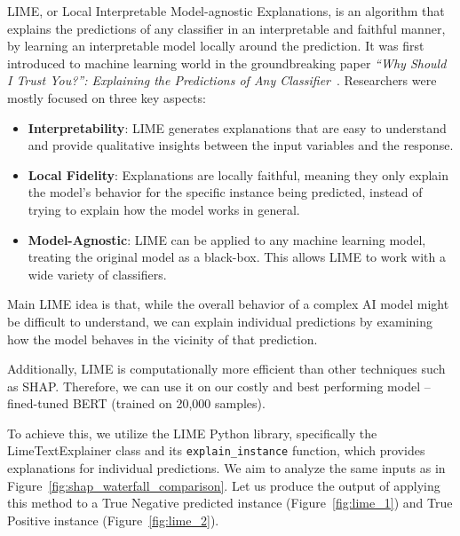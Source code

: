 LIME, or Local Interpretable Model-agnostic Explanations, is an algorithm that explains the predictions of any classifier in an interpretable and faithful manner, by learning an interpretable model locally around the prediction. It was first introduced to machine learning world in the groundbreaking paper \textit{“Why Should I Trust You?”: Explaining the Predictions of Any Classifier}~\cite{ribeiro2016should}. Researchers were mostly focused on three key aspects:

\vspace{3mm}

\begin{itemize}
    \item \textbf{Interpretability}: LIME generates explanations that are easy to understand and provide qualitative insights between the input variables and the response.
    \item \textbf{Local Fidelity}: Explanations are locally faithful, meaning they only explain the model's behavior for the specific instance being predicted, instead of trying to explain how the model works in general.

    \item \textbf{Model-Agnostic}: LIME can be applied to any machine learning model, treating the original model as a black-box. This allows LIME to work with a wide variety of classifiers.
\end{itemize}

\vspace{3mm}

Main LIME idea is that, while the overall behavior of a complex AI model might be difficult to understand, we can explain individual predictions by examining how the model behaves in the vicinity of that prediction.

\vspace{3mm}

Additionally, LIME is computationally more efficient than other techniques such as SHAP. Therefore, we can use it on our costly and best performing model -- fined-tuned BERT (trained on 20,000 samples).

\vspace{3mm}

To achieve this, we utilize the LIME Python library, specifically the LimeTextExplainer class and its \texttt{explain\_instance} function, which provides explanations for individual predictions. We aim to analyze the same inputs as in Figure~\ref{fig:shap_waterfall_comparison}. Let us produce the output of applying this method to a True Negative predicted instance (Figure~\ref{fig:lime_1}) and True Positive instance (Figure~\ref{fig:lime_2}).

